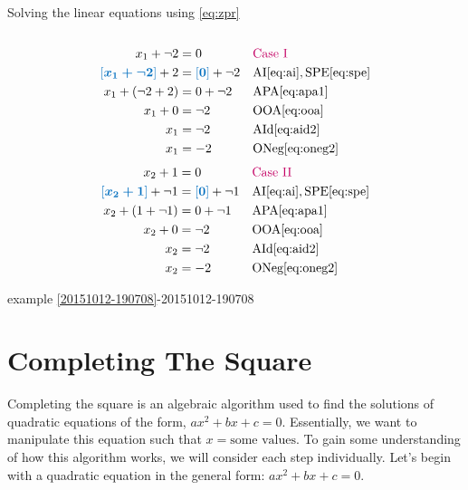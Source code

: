 \documentclass[20150903-160354-rs2.2-MarksMathNotebook.tex]{subfiles}
\begin{document}
\begin{example}[id:20151012-192313]
Solving the linear equations using  \eqref{eq:zpr} \\ \\
\begin{align*}
x_1+\neg 2& = 0  &&\text{\alert{Case I}} \\
\farg{x_1 +\neg 2}  + 2 &= \farg{0} + \neg 2 && \text{AI} \eqref{eq:ai},\text{SPE} \eqref{eq:spe}  \\
x_1+(\neg 2 + 2) &= 0 + \neg 2 && \text{APA} \eqref{eq:apa1} \\
x_1+0 &= \neg 2 && \text{OOA} \eqref{eq:ooa} \\
x_1&= \neg 2 && \text{AId} \eqref{eq:aid2} \\
x_1 &= -2 && \text{ONeg} \eqref{eq:oneg2} 
\end{align*}
\vspace{-0.5cm}
\begin{align*}
x_2+1 &= 0  &&\text{\alert{Case II}} \\
\farg{x_2+1} + \neg 1 &= \farg{0} + \neg 1 && \text{AI} \eqref{eq:ai},\text{SPE} \eqref{eq:spe}  \\
x_2 + (1 + \neg 1) &= 0+ \neg 1 && \text{APA} \eqref{eq:apa1} \\
x_2 + 0 &= \neg 2 && \text{OOA} \eqref{eq:ooa} \\
x_2 &= \neg 2 && \text{AId} \eqref{eq:aid2} \\
x_2 &= -2 && \text{ONeg} \eqref{eq:oneg2} 
\end{align*}

\qdepend

\qdependlist
example \ref{20151012-190708}-20151012-190708

\end{example}

\section{Completing The Square}
Completing the square is an algebraic algorithm used to find the solutions of quadratic equations of the form, $ax^2+bx+c=0$.   Essentially, we want to manipulate this equation such that $x=\text{some values}$.  To gain some understanding of how this algorithm works, we will consider each step individually.  Let's begin with a quadratic equation in the general form: $ax^2+bx+c=0$.\\
\end{document}
